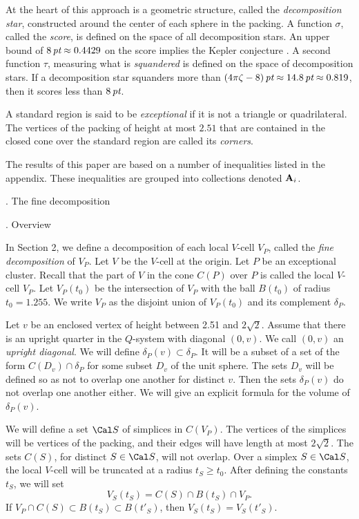 At the heart of this approach is a geometric structure, called
the {\it decomposition star}, constructed around the center of each
sphere in the packing.  A function $\sigma$, 
called the {\it score}, is defined
on the space of all decomposition stars.  An upper
 bound of $8\,\hbox{\it pt}\approx 0.4429$ on the
score implies the Kepler conjecture \cite{F}.  A second function $\tau$,
measuring what is {\it squandered\/} is defined on the space of
decomposition stars.  If a decomposition
star squanders
more than $(4\pi\zeta-8)\,\hbox{\it pt}\approx 14.8\,\hbox{\it pt}\approx 0.819$, 
then it scores less than $8\,\hbox{\it pt}$. 

\endsubhead

A standard region is said to be {\it exceptional\/} if it is
not a triangle or quadrilateral.  
The vertices of the packing of height at most $2.51$ that
are contained in the closed cone over the standard region
are called its {\it corners}.

The results of this paper are based on a number of inequalities listed
in the appendix.  These inequalities are grouped into collections
denoted ${\bold A}_i$.

\bigskip
\head {}. The fine decomposition\endhead


\subhead{}. Overview\endsubhead

In Section 2, we define a decomposition of each local $V$-cell
$V_P$, called the {\it fine decomposition\/} of $V_P$.  Let $V$ be
the $V$-cell at the origin.  Let $P$ be an exceptional
cluster.  Recall that the part of $V$ in the cone
$C(P)$ over $P$ is called the local
$V$-cell $V_P$.  Let $V_P(t_0)$ be the intersection of $V_P$ with
the ball $B(t_0)$ of radius $t_0 = 1.255$.  We write $V_P$ as
the disjoint union of $V_P(t_0)$ and its complement $\delta_P$.

Let $v$ be an enclosed vertex of height between 2.51 and $2\sqrt{2}$.
Assume that there is an upright quarter in the $Q$-system with
diagonal $(0,v)$.  
We call $(0,v)$ an {\it upright diagonal}.
  We will define $\delta_P(v)\subset\delta_P$.
It will be a subset of a set of the form $C(D_v)\cap\delta_P$ for
some subset $D_v$ of the unit sphere.  The sets $D_v$ will be defined
so as not to overlap one another for distinct $v$.  Then the sets
$\delta_P(v)$ do not overlap one another either.   We will give an
explicit formula for the volume of $\delta_P(v)$.

We will define a set $\Cal S$ of simplices in $C(V_P)$.  The vertices
of the simplices will be vertices of the packing, and their edges
will have length at most $2\sqrt{2}$.  The sets $C(S)$,
for distinct  $S\in\Cal S$,
 will not overlap.
Over a simplex $S\in\Cal S$,
  the local $V$-cell will be
truncated at a radius $t_S\ge t_0$.
  After defining the constants $t_S$, we will set
$$V_S(t_S) = C(S)\cap B(t_S)\cap V_P.$$
If $V_P\cap C(S)\subset B(t_S)\subset B(t'_S)$, then $V_S(t_S)=V_S(t'_S)$.

